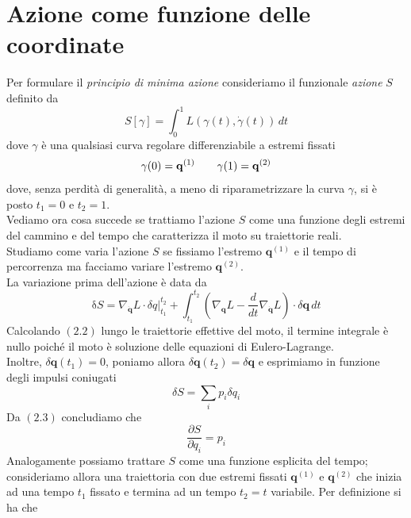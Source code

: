 \documentclass{article}
\begin{document}
\section{Azione come funzione delle coordinate}
Per formulare il \textit{principio di minima azione} consideriamo il funzionale \textit{azione} $S$ definito da
\begin{equation}
    S[\gamma] = \int_0^1 L(\gamma(t), \dot{\gamma}(t)) \, dt \tag{2.1}
\end{equation}
dove $\gamma$ è una qualsiasi curva regolare differenziabile a estremi fissati
\begin{align}
    \gamma(0) = \mathbf{q}^{(1)} \qquad \gamma(1) = \mathbf{q}^{(2)} \notag
\end{align}
dove, senza perdità di generalità, a meno di riparametrizzare la curva $\gamma$, si è posto $t_1 = 0$ e $t_2 = 1$. \\
Vediamo ora cosa succede se trattiamo l'azione $S$ come una funzione degli estremi del cammino e del tempo che caratterizza il moto su traiettorie reali. \\
Studiamo come varia l'azione $S$ se fissiamo l'estremo $\mathbf{q}^{(1)}$ e il tempo di percorrenza ma facciamo variare l'estremo $\mathbf{q}^{(2)}$. \\
La variazione prima dell'azione è data da
\begin{equation}
    \mathrm{\delta}S = \nabla_{\dot{\mathbf{q}}}L \cdot \delta q|_{t_1}^{t_2} + \int_{t_1}^{t_2} \left(\nabla_{\mathbf{q}}L - \frac{d}{dt}\nabla_{\dot{\mathbf{q}}}L\right) \cdot \delta\mathbf{q} \, dt \tag{2.2}
\end{equation}
Calcolando $(2.2)$ lungo le traiettorie effettive del moto, il termine integrale è nullo poiché il moto è soluzione delle equazioni di Eulero-Lagrange. \\
Inoltre, $\delta\mathbf{q}(t_1) = 0$, poniamo allora $\delta\mathbf{q}(t_2) = \delta\mathbf{q}$ e esprimiamo in funzione degli impulsi coniugati
\begin{equation}
    \delta S = \sum_i p_i \delta q_i \tag{2.3}
\end{equation}
Da $(2.3)$ concludiamo che
\begin{equation}
    \frac{\partial S}{\partial q_i} = p_i \tag{2.4}
\end{equation}
Analogamente possiamo trattare $S$ come una funzione esplicita del tempo; consideriamo allora una traiettoria con due estremi fissati $\mathbf{q}^{(1)}$ e $\mathbf{q}^{(2)}$ che inizia ad una tempo $t_1$ fissato e termina ad un tempo $t_2 = t$ variabile. Per definizione si ha che
\end{document}
